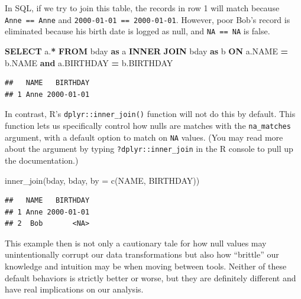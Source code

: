 \documentclass[
]{krantz}
\makeatletter
\newenvironment{Shaded}{\begin{snugshade}}{\end{snugshade}}
\newcommand{\AttributeTok}[1]{\textcolor[rgb]{0.61,0.61,0.61}{#1}}
\newcommand{\FunctionTok}[1]{\textcolor[rgb]{0,0,0}{#1}}
\newcommand{\KeywordTok}[1]{\textcolor[rgb]{0.27,0.27,0.27}{\textbf{#1}}}
\newcommand{\NormalTok}[1]{#1}
\newcommand{\OperatorTok}[1]{\textcolor[rgb]{0.43,0.43,0.43}{\textbf{#1}}}
\newcommand{\StringTok}[1]{\textcolor[rgb]{0.5,0.5,0.5}{#1}}
\newenvironment{kframe}{%
\medskip{}
\setlength{\fboxsep}{.8em}
 \def\at@end@of@kframe{}%
 \ifinner\ifhmode%
  \def\at@end@of@kframe{\end{minipage}}%
  \begin{minipage}{\columnwidth}%
 \fi\fi%
 \def\FrameCommand##1{\hskip\@totalleftmargin \hskip-\fboxsep
 \colorbox{shadecolor}{##1}\hskip-\fboxsep
     \hskip-\linewidth \hskip-\@totalleftmargin \hskip\columnwidth}%
 \MakeFramed {\advance\hsize-\width
   \@totalleftmargin\z@ \linewidth\hsize
   \@setminipage}}%
 {\par\unskip\endMakeFramed%
 \at@end@of@kframe}
\renewenvironment{Shaded}{\begin{kframe}}{\end{kframe}}
\makeatother
\begin{document}
In SQL, if we try to join this table, the records in row 1 will match because \texttt{\textquotesingle{}Anne\textquotesingle{}\ ==\ \textquotesingle{}Anne\textquotesingle{}} and \texttt{\textquotesingle{}2000-01-01\textquotesingle{}\ ==\ \textquotesingle{}2000-01-01\textquotesingle{}}.
However, poor Bob's record is eliminated because his birth date is logged as null, and \texttt{NA\ ==\ NA} is false.

\begin{Shaded}
\begin{Highlighting}[]
\KeywordTok{SELECT}\NormalTok{ a.}\OperatorTok{*}
\KeywordTok{FROM}
\NormalTok{  bday }\KeywordTok{as}\NormalTok{ a}
  \KeywordTok{INNER} \KeywordTok{JOIN}
\NormalTok{  bday }\KeywordTok{as}\NormalTok{ b}
  \KeywordTok{ON}
\NormalTok{  a.NAME }\OperatorTok{=}\NormalTok{ b.NAME }\KeywordTok{and}
\NormalTok{  a.BIRTHDAY }\OperatorTok{=}\NormalTok{ b.BIRTHDAY}
\end{Highlighting}
\end{Shaded}

\begin{verbatim}
##   NAME   BIRTHDAY
## 1 Anne 2000-01-01
\end{verbatim}

In contrast, R's \texttt{dplyr::inner\_join()} function will not do this by default.
This function lets us specifically control how nulls are matches with the \texttt{na\_matches} argument, with a default option to match on \texttt{NA} values.
(You may read more about the argument by typing \texttt{?dplyr::inner\_join} in the R console to pull up the documentation.)

\begin{Shaded}
\begin{Highlighting}[]
\FunctionTok{inner\_join}\NormalTok{(bday, bday, }\AttributeTok{by =} \FunctionTok{c}\NormalTok{(}\StringTok{\textquotesingle{}NAME\textquotesingle{}}\NormalTok{, }\StringTok{\textquotesingle{}BIRTHDAY\textquotesingle{}}\NormalTok{))}
\end{Highlighting}
\end{Shaded}

\begin{verbatim}
##   NAME   BIRTHDAY
## 1 Anne 2000-01-01
## 2  Bob       <NA>
\end{verbatim}

This example then is not only a cautionary tale for how null values may unintentionally corrupt our data transformations but also how ``brittle'' our knowledge and intuition may be when moving between tools.
Neither of these default behaviors is strictly better or worse, but they are definitely different and have real implications on our analysis.
\end{document}

